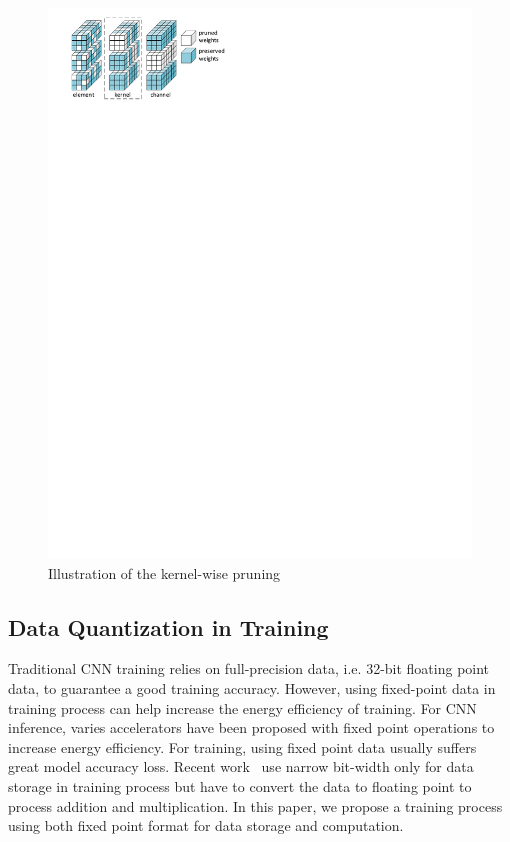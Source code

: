 \begin{figure}[tb]
    \centering
    \includegraphics[width=0.9\columnwidth]{figures/prune.pdf}
    \caption{Illustration of the kernel-wise pruning}\label{fig:prune}
\end{figure}

\subsection{Data Quantization in Training}
Traditional CNN training relies on full-precision data, i.e. 32-bit floating point data, to guarantee a good training accuracy. However, using fixed-point data in training process can help increase the energy efficiency of training. For CNN inference, varies accelerators have been proposed with fixed point operations to increase energy efficiency. For training, using fixed point data usually suffers great model accuracy loss. Recent work~\cite{zhou2016dorefa} use narrow bit-width only for data storage in training process but have to convert the data to floating point to process addition and multiplication. In this paper, we propose a training process using both fixed point format for data storage and computation. 

